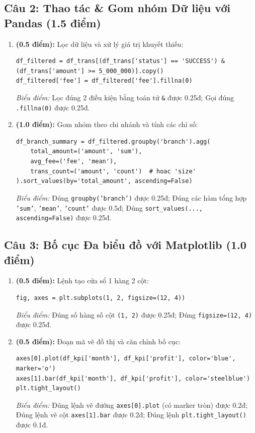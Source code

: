 \documentclass[11pt,a4paper]{article}
\begin{document}
\subsection*{Câu 2: Thao tác \& Gom nhóm Dữ liệu với Pandas (1.5 điểm)}
\begin{enumerate}[label=\textbf{\alph*)}]
  \item \textbf{(0.5 điểm):} Lọc dữ liệu và xử lý giá trị khuyết thiếu:
\begin{lstlisting}
df_filtered = df_trans[(df_trans['status'] == 'SUCCESS') & (df_trans['amount'] >= 5_000_000)].copy()
df_filtered['fee'] = df_filtered['fee'].fillna(0)
\end{lstlisting}
  \textit{Biểu điểm:} Lọc đúng 2 điều kiện bằng toán tử \texttt{\&} được 0.25đ; Gọi đúng \texttt{.fillna(0)} được 0.25đ.

  \item \textbf{(1.0 điểm):} Gom nhóm theo chi nhánh và tính các chỉ số:
\begin{lstlisting}
df_branch_summary = df_filtered.groupby('branch').agg(
    total_amount=('amount', 'sum'),
    avg_fee=('fee', 'mean'),
    trans_count=('amount', 'count')  # hoac 'size'
).sort_values(by='total_amount', ascending=False)
\end{lstlisting}
  \textit{Biểu điểm:} Đúng \texttt{groupby('branch')} được 0.25đ; Đúng các hàm tổng hợp \texttt{'sum'}, \texttt{'mean'}, \texttt{'count'} được 0.5đ; Đúng \texttt{sort\_values(..., ascending=False)} được 0.25đ.
\end{enumerate}

\subsection*{Câu 3: Bố cục Đa biểu đồ với Matplotlib (1.0 điểm)}
\begin{enumerate}[label=\textbf{\alph*)}]
  \item \textbf{(0.5 điểm):} Lệnh tạo cửa sổ 1 hàng 2 cột:
\begin{lstlisting}
fig, axes = plt.subplots(1, 2, figsize=(12, 4))
\end{lstlisting}
  \textit{Biểu điểm:} Đúng số hàng số cột \texttt{(1, 2)} được 0.25đ; Đúng \texttt{figsize=(12, 4)} được 0.25đ.

  \item \textbf{(0.5 điểm):} Đoạn mã vẽ đồ thị và căn chỉnh bố cục:
\begin{lstlisting}
axes[0].plot(df_kpi['month'], df_kpi['profit'], color='blue', marker='o')
axes[1].bar(df_kpi['month'], df_kpi['profit'], color='steelblue')
plt.tight_layout()
\end{lstlisting}
  \textit{Biểu điểm:} Đúng lệnh vẽ đường \texttt{axes[0].plot} (có marker tròn) được 0.2đ; Đúng lệnh vẽ cột \texttt{axes[1].bar} được 0.2đ; Đúng lệnh \texttt{plt.tight\_layout()} được 0.1đ.
\end{enumerate}
\end{document}
